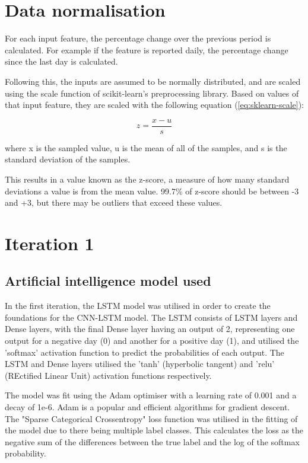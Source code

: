 \section{Data normalisation}
For each input feature, the percentage change over the previous period is calculated. For example if the feature
is reported daily, the percentage change since the last day is calculated.

Following this, the inputs are assumed to be normally distributed, and are scaled using the scale function of
scikit-learn's preprocessing library. Based on values of that input feature, they are scaled with the following
equation (\autoref{eq:sklearn-scale}):

\begin{equation}
    z = \frac{x - u}{s}
    \label{eq:sklearn-scale}
\end{equation}

where x is the sampled value, u is the mean of all of the samples, and s is the standard deviation of the samples.

This results in a value known as the z-score, a measure of how many standard deviations a value is from the mean value.
99.7\% of z-score should be between -3 and +3, but there may be outliers that exceed these values.
\section{Iteration 1}
\subsection{Artificial intelligence model used}
In the first iteration, the LSTM model was utilised in order to create the foundations for the CNN-LSTM model. The LSTM
consists of LSTM layers and Dense layers, with the final Dense layer having an output of 2, representing one output for
a negative day (0) and another for a positive day (1), and utilised the 'softmax' activation function to predict the
probabilities of each output. The LSTM and Dense layers utilised the 'tanh' (hyperbolic tangent) and 'relu'
(REctified Linear Unit) activation functions respectively.

The model was fit using the Adam optimiser with a learning rate of 0.001 and a decay of 1e-6. Adam is a popular
and efficient algorithms for gradient descent.
The "Sparse Categorical Crossentropy" loss function was utilised in the fitting of the model due to there being multiple
label classes. This calculates the loss as the negative sum of the differences between the true label and the log of the softmax
probability.


